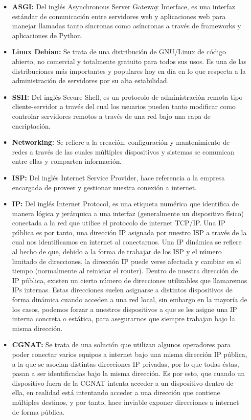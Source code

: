 \documentclass{article}
\begin{document}
\begin{itemize}
	\item \textbf{ASGI:} Del inglés Asynchronous Server Gateway Interface, es una interfaz estándar de comunicación entre servidores web y aplicaciones web para manejar llamadas tanto síncronas como asíncronas a través de frameworks y aplicaciones de Python.
	\item \textbf{Linux Debian:} Se trata de una distribución de GNU/Linux de código abierto, no comercial y totalmente gratuito para todos sus usos. Es una de las distribuciones más importantes y populares hoy en día en lo que respecta a la administración de servidores por su alta estabilidad.
	\item \textbf{SSH:} Del inglés Secure Shell, es un protocolo de administración remota tipo cliente-servidor a través del cual los usuarios pueden tanto modificar como controlar servidores remotos a través de una red bajo una capa de encriptación.
	\item \textbf{Networking:} Se refiere a la creación, configuración y mantenimiento de redes a través de las cuales múltiples dispositivos y sistemas se comunican entre ellas y comparten información.
	\item \textbf{ISP:} Del inglés Internet Service Provider, hace referencia a la empresa encargada de proveer y gestionar nuestra conexión a internet.
	\item \textbf{IP:} Del inglés Internet Protocol, es una etiqueta numérica que identifica de manera lógica y jerárquica a una interfaz (generalmente un dispositivo físico) conectada a la red que utilice el protocolo de internet TCP/IP. Una IP pública es por tanto, una dirección IP asignada por nuestro ISP a través de la cual nos identificamos en internet al conectarnos.
	Una IP dinámica se refiere al hecho de que, debido a la forma de trabajar de los ISP y el número limitado de direcciones, la dirección IP puede verse afectada y cambiar en el tiempo (normalmente al reiniciar el router). Dentro de nuestra dirección de IP pública, existen un cierto número de direcciones utilizables que llamaremos IPs internas. Estas direcciones suelen asignarse a distintos dispositivos de forma dinámica cuando acceden a una red local, sin embargo en la mayoría de los casos, podemos forzar a nuestros dispositivos a que se les asigne una IP interna concreta o estática, para asegurarnos que siempre trabajan bajo la misma dirección.
	\item \textbf{CGNAT:} Se trata de una solución que utilizan algunos operadores para poder conectar varios equipos a internet bajo una misma dirección IP pública, a la que se asocian distintas direcciones IP privadas, por lo que todas éstas, pasan a ser identificadas bajo la misma dirección. Es por esto, que cuando un dispositivo fuera de la CGNAT intenta acceder a un dispositivo dentro de ella, en realidad está intentando acceder a una dirección que contiene múltiples destinos, y por tanto, hace inviable exponer direcciones a internet de forma pública.

\end{itemize}
\end{document}
